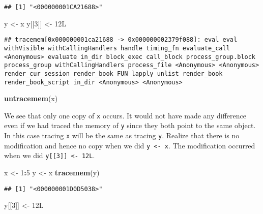 \documentclass[]{book}
\newenvironment{Shaded}{\begin{snugshade}}{\end{snugshade}}
\newcommand{\DecValTok}[1]{\textcolor[rgb]{0.00,0.00,0.81}{#1}}
\newcommand{\KeywordTok}[1]{\textcolor[rgb]{0.13,0.29,0.53}{\textbf{#1}}}
\newcommand{\NormalTok}[1]{#1}
\newcommand{\OperatorTok}[1]{\textcolor[rgb]{0.81,0.36,0.00}{\textbf{#1}}}
\newcommand{\StringTok}[1]{\textcolor[rgb]{0.31,0.60,0.02}{#1}}
\begin{document}
\begin{verbatim}
## [1] "<000000001CA21688>"
\end{verbatim}

\begin{Shaded}
\begin{Highlighting}[]
\NormalTok{y <-}\StringTok{ }\NormalTok{x}
\NormalTok{y[[}\DecValTok{3}\NormalTok{]] <-}\StringTok{ }\NormalTok{12L}
\end{Highlighting}
\end{Shaded}

\begin{verbatim}
## tracemem[0x000000001ca21688 -> 0x000000002379f088]: eval eval withVisible withCallingHandlers handle timing_fn evaluate_call <Anonymous> evaluate in_dir block_exec call_block process_group.block process_group withCallingHandlers process_file <Anonymous> <Anonymous> render_cur_session render_book FUN lapply unlist render_book render_book_script in_dir <Anonymous> <Anonymous>
\end{verbatim}

\begin{Shaded}
\begin{Highlighting}[]
\KeywordTok{untracemem}\NormalTok{(x)}
\end{Highlighting}
\end{Shaded}

We see that only one copy of \texttt{x} occurs. It would not have made any difference even if we had traced the memory of \texttt{y} since they both point to the same object. In this case tracing \texttt{x} will be the same as tracing \texttt{y}. Realize that there is no modification and hence no copy when we did \texttt{y\ \textless{}-\ x}. The modification occurred when we did \texttt{y{[}{[}3{]}{]}\ \textless{}-\ 12L}.

\begin{Shaded}
\begin{Highlighting}[]
\NormalTok{x <-}\StringTok{ }\DecValTok{1}\OperatorTok{:}\DecValTok{5}
\NormalTok{y <-}\StringTok{ }\NormalTok{x}
\KeywordTok{tracemem}\NormalTok{(y)}
\end{Highlighting}
\end{Shaded}

\begin{verbatim}
## [1] "<000000001D0D5038>"
\end{verbatim}

\begin{Shaded}
\begin{Highlighting}[]
\NormalTok{y[[}\DecValTok{3}\NormalTok{]] <-}\StringTok{ }\NormalTok{12L}
\end{Highlighting}
\end{Shaded}
\end{document}
